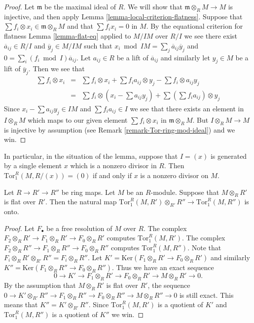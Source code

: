 \begin{proof}
Let $\mathfrak m$ be the maximal ideal of $R$.
We will show that $\mathfrak m \otimes_R M \to M$ is injective,
and then apply Lemma \ref{lemma-local-criterion-flatness}.
Suppose that $\sum f_i \otimes x_i \in \mathfrak m \otimes_R M$
and that $\sum f_i x_i = 0$ in $M$. By the equational criterion
for flatness Lemma \ref{lemma-flat-eq} applied to $M/IM$
over $R/I$ we see there exist $\overline{a}_{ij} \in R/I$
and $\overline{y}_j \in M/IM$ such that
$x_i \bmod IM = \sum_j \overline{a}_{ij} \overline{y}_j $
and $0 = \sum_i (f_i \bmod I) \overline{a}_{ij}$.
Let $a_{ij} \in R$ be a lift of $\overline{a}_{ij}$ and
similarly let $y_j \in M$ be a lift of $\overline{y}_j$.
Then we see that
\begin{eqnarray*}
\sum f_i \otimes x_i
& = &
\sum f_i \otimes x_i +
\sum f_ia_{ij} \otimes y_j -
\sum f_i \otimes a_{ij} y_j
\\
& = &
\sum f_i \otimes (x_i - \sum a_{ij} y_j) +
\sum (\sum f_i a_{ij}) \otimes y_j
\end{eqnarray*}
Since $x_i - \sum a_{ij} y_j \in IM$ and
$\sum f_i a_{ij} \in I$ we see that there exists
an element in $I \otimes_R M$ which maps to our given
element $\sum f_i \otimes x_i$ in $\mathfrak m \otimes_R M$.
But $I \otimes_R M \to M$ is injective by assumption (see
Remark \ref{remark-Tor-ring-mod-ideal}) and we win.
\end{proof}

\noindent
In particular, in the situation of the lemma, suppose that
$I = (x)$ is generated by a single element $x$ which is
a nonzero divisor in $R$. Then $\text{Tor}_1^R(M, R/(x)) = (0)$
if and only if $x$ is a nonzero divisor on $M$.

\begin{lemma}
\label{lemma-surjective-on-tor-one}
Let $R \to R' \to R''$ be ring maps.
Let $M$ be an $R$-module. Suppose that $M \otimes_R R'$ 
is flat over $R'$. Then the natural map
$\text{Tor}_1^R(M, R') \otimes_{R'} R'' \to
\text{Tor}_1^R(M, R'')$ is onto.
\end{lemma}

\begin{proof}
Let $F_\bullet$ be a free resolution of $M$ over $R$.
The complex $F_2 \otimes_R R' \to F_1\otimes_R R' \to F_0 \otimes_R R'$
computes $\text{Tor}_1^R(M, R')$. 
The complex $F_2 \otimes_R R'' \to F_1\otimes_R R'' \to F_0 \otimes_R R''$
computes $\text{Tor}_1^R(M, R'')$. Note that
$F_i \otimes_R R' \otimes_{R'} R'' = F_i \otimes_R R''$. Let
$K' = \text{Ker}(F_1\otimes_R R' \to F_0 \otimes_R R')$ and
similarly $K'' = \text{Ker}(F_1\otimes_R R'' \to F_0 \otimes_R R'')$.
Thus we have an exact sequence
$$
0 \to K' \to F_1\otimes_R R' \to F_0 \otimes_R R' \to M\otimes_R R' \to 0.
$$
By the assumption that $M\otimes_R R'$ is flat over $R'$,
the sequence $0 \to K' \otimes_{R'} R''
\to F_1 \otimes_R R'' \to F_0 \otimes_R R'' \to M\otimes_R R'' \to 0$
is still exact. This means that $K'' = K' \otimes_{R'} R''$.
Since $\text{Tor}_1^R(M, R')$ is a quotient of $K'$ and
$\text{Tor}_1^R(M, R'')$ is a quotient of $K''$ we win.
\end{proof}

